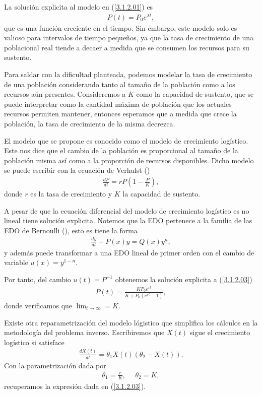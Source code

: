 La solución explicita al modelo en (\ref{3.1.2.01}) es
\begin{align*}
    P(t) = P_0 e^{\lambda t },
\end{align*}
que es una función creciente en el tiempo. Sin embargo, este modelo solo es valioso para intervalos de tiempo pequeños, ya que la tasa de crecimiento de una poblacional real tiende a decaer a medida que se consumen los recursos para su sustento.

Para saldar con la dificultad planteada, podemos modelar la tasa de crecimiento de una población considerando tanto al tamaño de la población como a los recursos aún presentes. Consideremos a $K$ como la capacidad de sustento, que se puede interpretar como la cantidad máxima de población que los actuales recursos permiten mantener, entonces esperamos que a medida que crece la población, la tasa de crecimiento de la misma decrezca.

El modelo que se propone es conocido como el modelo de crecimiento logístico. Este nos dice que el cambio de la población es proporcional al tamaño de la población misma así como a la proporción de recursos disponibles. Dicho modelo se puede escribir con la ecuación de Verhulst (\cite{zill2002ecuaciones}) 
\begin{align}
    \frac{dP}{dt} = rP\left(1- \frac{P}{K}  \right),
    \label{3.1.2.03}
\end{align}
donde $r$ es la tasa de crecimiento y $K$ la capacidad de sustento.

A pesar de que la ecuación diferencial del modelo de crecimiento logístico es no lineal tiene solución explicita. Notemos que la EDO pertenece a la familia de las EDO de Bernoulli (\cite{apostol1991calculus}), esto es tiene la forma
\begin{align*}
    \frac{dy}{dt} + P(x) y =Q(x) y^n,
\end{align*}
y además puede transformar a una EDO lineal de primer orden con el cambio de variable $u(x) = y ^{1-n}$.

Por tanto, del cambio $u(t) = P^{-1}$ obtenemos la solución explicita a (\ref{3.1.2.03})
\begin{align}
    P(t) = \frac{KP_0 e^{rt}}{K + P_0 \left(e^{rt}-1\right)},    
    \label{3.1.2.05}
\end{align}
donde verificamos que $\lim_{t \rightarrow \infty} = K $. 

Existe otra reparametrización del modelo lógistico que simplifica los cálculos en la metodología del problema inverso. Escribiremos que $X(t)$ sigue el crecimiento logístico si satisface
\begin{align}
    \frac{dX(t)}{dt} = \theta_1 X(t)\left(\theta_2 - X(t)\right).
    \label{3.1.2.06}
\end{align}
Con la parametrización dada por
\begin{align*}
    \theta_1 = \frac{r}{K}, \:\:\:\:\:\: \theta_2 = K,
\end{align*}
recuperamos la expresión dada en (\ref{3.1.2.03}).


